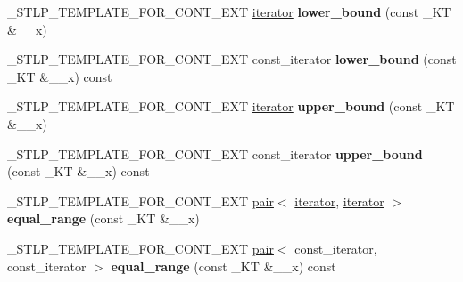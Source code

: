 \begin{DoxyCompactItemize}
\mbox{\label{classmultiset_a53ede63ac7dce6590b046778e6ebf393}} 
\+\_\+\+S\+T\+L\+P\+\_\+\+T\+E\+M\+P\+L\+A\+T\+E\+\_\+\+F\+O\+R\+\_\+\+C\+O\+N\+T\+\_\+\+E\+XT \hyperlink{structiterator}{iterator} {\bfseries lower\+\_\+bound} (const \+\_\+\+KT \&\+\_\+\+\_\+x)
\item 
\mbox{\label{classmultiset_ad153c50811b1b9312facd4eaa89b58c1}} 
\+\_\+\+S\+T\+L\+P\+\_\+\+T\+E\+M\+P\+L\+A\+T\+E\+\_\+\+F\+O\+R\+\_\+\+C\+O\+N\+T\+\_\+\+E\+XT const\+\_\+iterator {\bfseries lower\+\_\+bound} (const \+\_\+\+KT \&\+\_\+\+\_\+x) const
\item 
\mbox{\label{classmultiset_a63cb61cbba12577efada5ae0d5853ffc}} 
\+\_\+\+S\+T\+L\+P\+\_\+\+T\+E\+M\+P\+L\+A\+T\+E\+\_\+\+F\+O\+R\+\_\+\+C\+O\+N\+T\+\_\+\+E\+XT \hyperlink{structiterator}{iterator} {\bfseries upper\+\_\+bound} (const \+\_\+\+KT \&\+\_\+\+\_\+x)
\item 
\mbox{\label{classmultiset_aec08cc48bf9ec4661d65b04eff9a4a81}} 
\+\_\+\+S\+T\+L\+P\+\_\+\+T\+E\+M\+P\+L\+A\+T\+E\+\_\+\+F\+O\+R\+\_\+\+C\+O\+N\+T\+\_\+\+E\+XT const\+\_\+iterator {\bfseries upper\+\_\+bound} (const \+\_\+\+KT \&\+\_\+\+\_\+x) const
\item 
\mbox{\label{classmultiset_a9c27a9f51af8a7626f8d5a56a7b5302f}} 
\+\_\+\+S\+T\+L\+P\+\_\+\+T\+E\+M\+P\+L\+A\+T\+E\+\_\+\+F\+O\+R\+\_\+\+C\+O\+N\+T\+\_\+\+E\+XT \hyperlink{structpair}{pair}$<$ \hyperlink{structiterator}{iterator}, \hyperlink{structiterator}{iterator} $>$ {\bfseries equal\+\_\+range} (const \+\_\+\+KT \&\+\_\+\+\_\+x)
\item 
\mbox{\label{classmultiset_aa965715d7640225bbcbc081031b656f8}} 
\+\_\+\+S\+T\+L\+P\+\_\+\+T\+E\+M\+P\+L\+A\+T\+E\+\_\+\+F\+O\+R\+\_\+\+C\+O\+N\+T\+\_\+\+E\+XT \hyperlink{structpair}{pair}$<$ const\+\_\+iterator, const\+\_\+iterator $>$ {\bfseries equal\+\_\+range} (const \+\_\+\+KT \&\+\_\+\+\_\+x) const
\end{DoxyCompactItemize}
